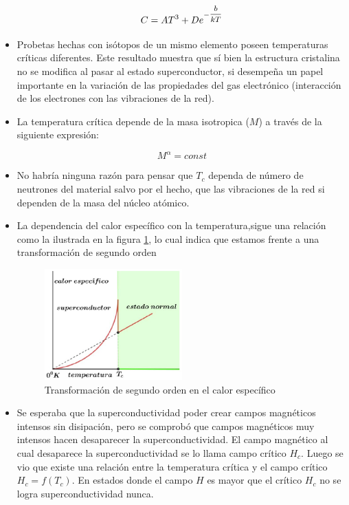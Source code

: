 \begin{itemize}
\begin{equation}
	C= AT^{3}+De^{-\mfrac{b}{kT}}
\end{equation}

	\item Probetas hechas con isótopos de un mismo elemento poseen temperaturas críticas diferentes. Este resultado muestra que sí bien la estructura cristalina no se modifica al pasar al estado superconductor, si desempeña un papel importante en la variación de las propiedades del gas electrónico (interacción de los electrones con las vibraciones de la red).
	
	\item La temperatura crítica depende de la masa isotropica ($M$) a través de la siguiente expresión:
	
\begin{equation}
	M^{\alpha}= const
\end{equation}
	
	\item No habría ninguna razón para pensar que $T_{c}$ dependa de número de neutrones del material salvo por el hecho, que las vibraciones de la red si dependen de la masa del núcleo atómico.
	
	\item La dependencia del calor específico con la temperatura,sigue una relación como la ilustrada en la figura \ref{fig:410}, lo cual indica que estamos frente a una transformación de segundo orden
	
\begin{figure}[H]
    \centering
    \includegraphics[width=0.5\textwidth]{./Figures/fig410}
	\caption{Transformación de segundo orden en el calor específico}
	\label{fig:410}
\end{figure}
	
	\item Se esperaba que la superconductividad poder crear campos magnéticos intensos sin disipación, pero se comprobó que campos magnéticos muy intensos hacen desaparecer la superconductividad. El campo magnético al cual desaparece la superconductividad se lo llama campo crítico $H_{c}$. Luego se vio que existe una relación entre la temperatura crítica y el campo crítico $H_{c}=f(T_{c})$. En estados donde el campo $H$ es mayor que el crítico $H_{c}$ no se logra superconductividad nunca.	
	

\end{itemize}
